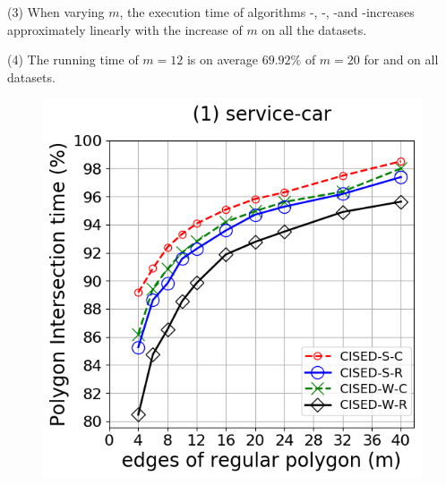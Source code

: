 {\ni(3) When varying $m$, the execution time of algorithms \cist-\rpia, \cist-\cpia, \cista-\rpia and \cista-\cpia increases approximately linearly with the increase of $m$ on all the datasets.

\ni(4) The running time of $m=12$ is on average $69.92\%$ of $m=20$ for \cist and \cista on all datasets.




\begin{figure}[tb!]
	\centering
	\includegraphics[scale = 0.275]{Figures/Exp-M-poly-time-ratio-service.png}\hspace{3ex}

\end{figure}}
